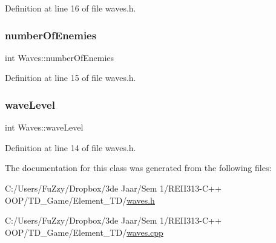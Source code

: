 Definition at line 16 of file waves.\+h.

\mbox{\label{class_waves_a5539b3131120a19665884a63b6e9c029}} 
\subsubsection{\texorpdfstring{number\+Of\+Enemies}{numberOfEnemies}}
{\footnotesize\ttfamily int Waves\+::number\+Of\+Enemies}



Definition at line 15 of file waves.\+h.

\mbox{\label{class_waves_abfdc18a5f2f185285173797c1c67c6f9}} 
\subsubsection{\texorpdfstring{wave\+Level}{waveLevel}}
{\footnotesize\ttfamily int Waves\+::wave\+Level}



Definition at line 14 of file waves.\+h.



The documentation for this class was generated from the following files\+:\begin{DoxyCompactItemize}
\item 
C\+:/\+Users/\+Fu\+Zzy/\+Dropbox/3de Jaar/\+Sem 1/\+R\+E\+I\+I313-\/\+C++ O\+O\+P/\+T\+D\+\_\+\+Game/\+Element\+\_\+\+T\+D/\hyperlink{waves_8h}{waves.\+h}\item 
C\+:/\+Users/\+Fu\+Zzy/\+Dropbox/3de Jaar/\+Sem 1/\+R\+E\+I\+I313-\/\+C++ O\+O\+P/\+T\+D\+\_\+\+Game/\+Element\+\_\+\+T\+D/\hyperlink{waves_8cpp}{waves.\+cpp}\end{DoxyCompactItemize}
